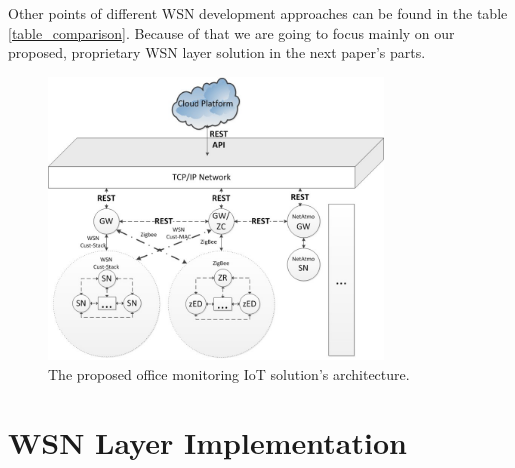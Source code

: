 \documentclass[journal]{IEEEtran}
\begin{document}
Other points of different WSN development approaches can be found in the table \ref{table_comparison}. Because of that we are going to focus mainly on our proposed, proprietary WSN layer solution in the next paper's parts.
\begin{figure}[!t]
\centering
\includegraphics[width=3.5in]{iot_arch}
\caption{The proposed office monitoring IoT solution's architecture.}
\label{iot_arch}
\end{figure}
\section{WSN Layer Implementation}
\end{document}
